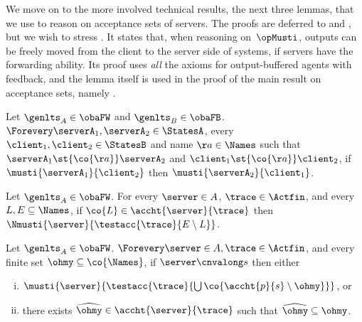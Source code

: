 We move on to the more involved technical results, \ie the next
  three lemmas, that we use to reason on acceptance sets of servers.
  The proofs are deferred to  and ,
  but we wish to stress .
  It states that, when reasoning on~$\opMusti$,
  outputs can be freely moved from the client to the server side of
  systems, if servers %
  have the forwarding ability.
  Its proof uses {\em all} the axioms for output-buffered agents with
  feedback, and the lemma itself is used in the proof of the main
  result on acceptance sets, namely .

\begin{lemma}
  \label{lem:must-output-swap-l-fw}
  Let $\genlts_A \in \obaFW$ and
  $\genlts_B \in \obaFB$.
  $\Forevery \serverA_1, \serverA_2 \in \StatesA$,
  every $\client_1, \client_2 \in \StatesB$ and name $\aa \in \Names$ such that
  $\serverA_1 \st{\co{\aa}} \serverA_2$ and
  $\client_1 \st{\co{\aa}} \client_2$,
  if $\musti{\serverA_1}{\client_2}$ then $\musti{\serverA_2}{\client_1}$.
\end{lemma}

\begin{lemma}
  \label{lem:completeness-part-2.2-diff-outputs}
  Let $\genlts_A \in \obaFW$.
  For every $\server \in \States$, $\trace \in \Actfin$,
  and every $L, E \subseteq \Names$, if
  $\co{L} \in \accht{ \server }{ \trace }$
  then $\Nmusti{ \server }{ \testacc{\trace}{E \setminus L}}$.
\end{lemma}



\begin{lemma}
  \label{lem:completeness-part-2.2-auxiliary}
  Let $\genlts_A \in \obaFW$.
  $\Forevery \server \in \States, \trace \in \Actfin$,
  and every finite set $\ohmy \subseteq \co{\Names}$,
  if $\server \cnvalong s$ then either
  \begin{enumerate}[(i)]
      \item
    $\musti{\server}{\testacc{ \trace }{ \bigcup \co{ \accht{p}{s}
          \setminus \ohmy }}}$, or
  \item
    there exists $\widehat{\ohmy} \in \accht{ \server }{ \trace }$ such that $\widehat{\ohmy} \subseteq \ohmy$.
  \end{enumerate}
\end{lemma}

